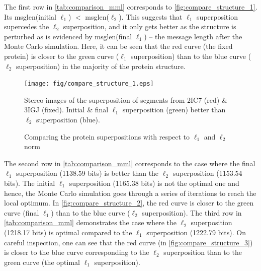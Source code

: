 \documentclass[wcp]{jmlr}
\begin{document}
The first row in \autoref{tab:comparison_mml} corresponds to \autoref{fig:compare_structure_1}.
Its msglen(initial $\ell_1$) $<$ msglen($\ell_2$). This suggests that $\ell_1$ superposition supercedes 
the $\ell_2$ superposition, and it only gets better
as the structure is perturbed as is evidenced by msglen(final $\ell_1$) -- the message length
after the Monte Carlo simulation. Here, it can be seen that the red curve (the fixed protein) 
is closer to the green curve ($\ell_1$ superposition) than to the blue curve ($\ell_2$ superposition)
in the majority of the protein structure.
\begin{figure}[!htb]
\centering
\texttt{[image: fig/compare\_structure\_1.eps]}
\caption{Stereo images of the superposition of segments from 2IC7 (red) \& 3IGJ (fixed). Initial \& final $\ell_1$ superposition (green) better than $\ell_2$ superposition (blue).}
\label{fig:compare_structure_1}
\end{figure}
\begin{figure}[!htb]
  \centering
    \hspace{0.5cm}
    \caption{Comparing the protein superpositions with respect to $\ell_1$ and $\ell_2$ norm}
    \label{fig:protein_superposition}
\end{figure}

The second row in \autoref{tab:comparison_mml} corresponds to the case where the final $\ell_1$
superposition (1138.59 bits) is better than the $\ell_2$ superposition (1153.54 bits). The initial
$\ell_1$ superposition (1165.38 bits) is not the optimal one and hence, the 
Monte Carlo simulation goes through a series of
iterations to reach the local optimum. In \ref{fig:compare_structure_2}, the red curve is closer
to the  green curve (final $\ell_1$) than to the blue curve ($\ell_2$ superposition).
The third row in \autoref{tab:comparison_mml} demonstrates the case where the $\ell_2$ superposition
(1218.17 bits) is optimal compared to the $\ell_1$ superposition (1222.79 bits). On careful 
inspection, one can see that the red curve (in \ref{fig:compare_structure_3}) is closer
to the blue curve corresponding to the $\ell_2$ superposition than to the green curve (the optimal $\ell_1$ superposition).
\end{document}
